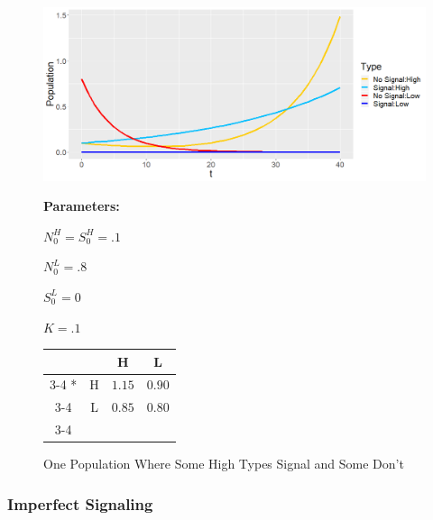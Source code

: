 \begin{figure}[hp]
   \caption{One Population Where Some High Types Signal and Some Don't}
   \label{fig:One_Pop}
    \includegraphics[width=\textwidth, height=.28\textheight]{Images/One_Pop.png}
 \begin{minipage}[c]{.2\textwidth}
    \textbf{Parameters:}
    \end{minipage}\hfill
    \begin{minipage}[c]{.2\textwidth}
    
    $N_0^H = S_0^H = .1$
    
    $N_0^L = .8$
    
    $S_0^L = 0$
    
    $K = .1$

    \end{minipage}\hfill
  \begin{minipage}[c]{.3\textwidth}
  \begin{tabular}{cc|c|c|}
      & \multicolumn{1}{c}{} & \multicolumn{1}{c}{H}  & \multicolumn{1}{c}{L} \\\cline{3-4}
      \multirow{2}*{}  & H & $1.15$ & $0.90$ \\\cline{3-4}
      & L & $0.85$ & $0.80$ \\\cline{3-4}
    \end{tabular}
    \end{minipage}\hfill
    \begin{minipage}[c]{.3\textwidth}

    \end{minipage}
    \end{figure}
\newpage
\subsubsection{Imperfect Signaling}

